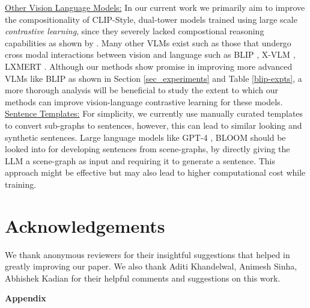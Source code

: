 \documentclass[11pt]{article}
\begin{document}
\noindent \underline{Other Vision Language Models:} In our current work we primarily aim to improve the compositionality of CLIP-Style, dual-tower models trained using large scale \textit{contrastive learning}, since they severely lacked compostional reasoning capabilities as shown by \citep{yuksekgonul2022and}. Many other VLMs exist such as those that undergo cross modal interactions between vision and language such as BLIP \citep{li2022blip}, X-VLM \citep{zeng2021multi}, LXMERT \citep{tan-bansal-2019-lxmert}. Although our methods show promise in improving more advanced VLMs like BLIP as shown in Section \ref{sec_experiments} and Table \ref{blip-expts}, a more thorough analysis will be beneficial to study the extent to which our methods can improve vision-language contrastive learning for these models.\\

\noindent \underline{Sentence Templates:} For simplicity, we currently use manually curated templates to convert sub-graphs to sentences, however, this can lead to similar looking and synthetic sentences. Large language models like GPT-4 \citep{openai2023gpt4}, BLOOM \citep{bloom} should be looked into for developing sentences from scene-graphs, by directly giving the LLM a scene-graph as input and requiring it to generate a sentence. This approach might be effective but may also lead to higher computational cost while training. \section*{Acknowledgements}
We thank anonymous reviewers for their insightful suggestions that helped in greatly improving our paper. We also thank Aditi Khandelwal, Animesh Sinha, Abhishek Kadian for their helpful comments and suggestions on this work. 
\FloatBarrier



\appendix
\clearpage
\hspace{-0.4cm}\textbf{\LARGE Appendix}
\end{document}
